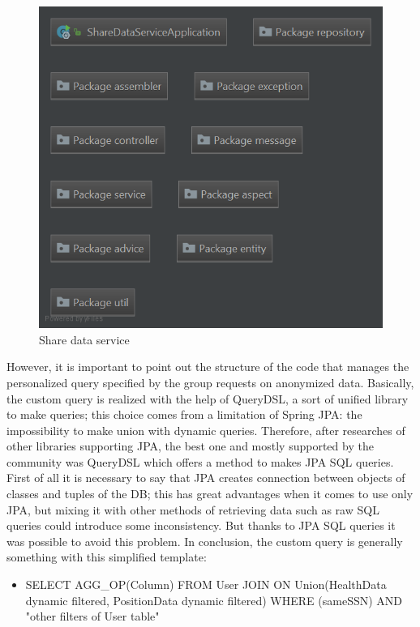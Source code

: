 \begin{figure}[H]
\includegraphics[width=\linewidth]{images/PackageSharedataservice.png}
\caption{ Share data service }
\label{fig:pkgsharedata}
\end{figure}

However, it is important to point out the structure of the code that manages the personalized query specified by the group requests on 
anonymized data. Basically, the custom query is realized with the help of QueryDSL, a sort of unified library to make queries; this choice comes from a limitation of Spring JPA: the impossibility to make union with dynamic queries. Therefore, after researches of other libraries supporting JPA, the best one and mostly supported by the community was QueryDSL which offers a method to makes JPA SQL queries. First of all it is necessary to say that JPA creates connection between objects of classes  and tuples of the DB; this has great advantages when it comes to use only JPA, but mixing it with other methods of retrieving data such as raw SQL queries could introduce some inconsistency. But thanks to JPA SQL queries it was possible to avoid this problem. In conclusion, the custom query is generally something with this simplified template:
\begin{itemize}
\item SELECT AGG\_OP(Column) FROM User JOIN ON Union(HealthData dynamic filtered, PositionData dynamic filtered) WHERE (sameSSN) AND "other filters of User table"
\end{itemize}
  
